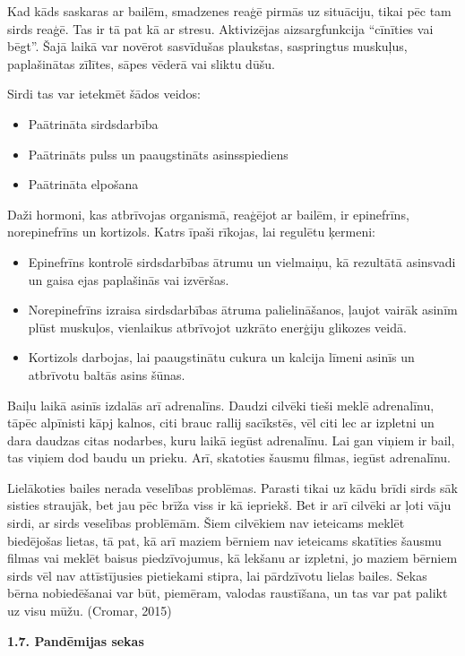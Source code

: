\documentclass[12pt]{article}
\begin{document}
Kad kāds saskaras ar bailēm, smadzenes reaģē pirmās uz situāciju, tikai pēc tam sirds reaģē. Tas ir tā pat kā ar stresu. Aktivizējas aizsargfunkcija “cīnīties vai bēgt”.  Šajā laikā var novērot sasvīdušas plaukstas, saspringtus muskuļus, paplašinātas zīlītes, sāpes vēderā vai sliktu dūšu. \par
Sirdi tas var ietekmēt šādos veidos:
\begin{itemize}
\setlength\itemsep{0em}
  \item Paātrināta sirdsdarbība
  \item Paātrināts pulss un paaugstināts asinsspiediens
  \item Paātrināta elpošana
\end{itemize}
Daži hormoni, kas atbrīvojas organismā, reaģējot ar bailēm, ir epinefrīns, norepinefrīns un kortizols. Katrs īpaši rīkojas, lai regulētu ķermeni:
\begin{itemize}
\setlength\itemsep{0em}
  \item Epinefrīns kontrolē sirdsdarbības ātrumu un vielmaiņu, kā rezultātā asinsvadi un gaisa ejas paplašinās vai izvēršas.
  \item Norepinefrīns izraisa sirdsdarbības ātruma palielināšanos, ļaujot vairāk asinīm plūst muskuļos, vienlaikus atbrīvojot uzkrāto enerģiju glikozes veidā. 
  \item Kortizols darbojas, lai paaugstinātu cukura un kalcija līmeni asinīs un atbrīvotu baltās asins šūnas.
\end{itemize}


Baiļu laikā asinīs izdalās arī adrenalīns. Daudzi cilvēki tieši meklē adrenalīnu, tāpēc alpīnisti kāpj kalnos, citi brauc rallij sacīkstēs, vēl citi lec ar izpletni un dara daudzas citas nodarbes, kuru laikā iegūst adrenalīnu. Lai gan viņiem ir bail, tas viņiem dod baudu un prieku. Arī, skatoties šausmu filmas, iegūst adrenalīnu. \par
Lielākoties bailes nerada veselības problēmas. Parasti tikai uz kādu brīdi sirds sāk sisties straujāk, bet jau pēc brīža viss ir kā iepriekš. Bet ir arī cilvēki ar ļoti vāju sirdi, ar sirds veselības problēmām. Šiem cilvēkiem nav ieteicams meklēt biedējošas lietas, tā pat, kā arī maziem bērniem nav ieteicams skatīties šausmu filmas vai meklēt baisus piedzīvojumus, kā lekšanu ar izpletni, jo maziem bērniem sirds vēl nav attīstījusies pietiekami stipra, lai pārdzīvotu lielas bailes. Sekas bērna nobiedēšanai var būt, piemēram, valodas raustīšana, un tas var pat palikt uz visu mūžu. (Cromar, 2015)

\begin{center}
{\bf 1.7. Pandēmijas sekas}
\end{center}
\end{document}

